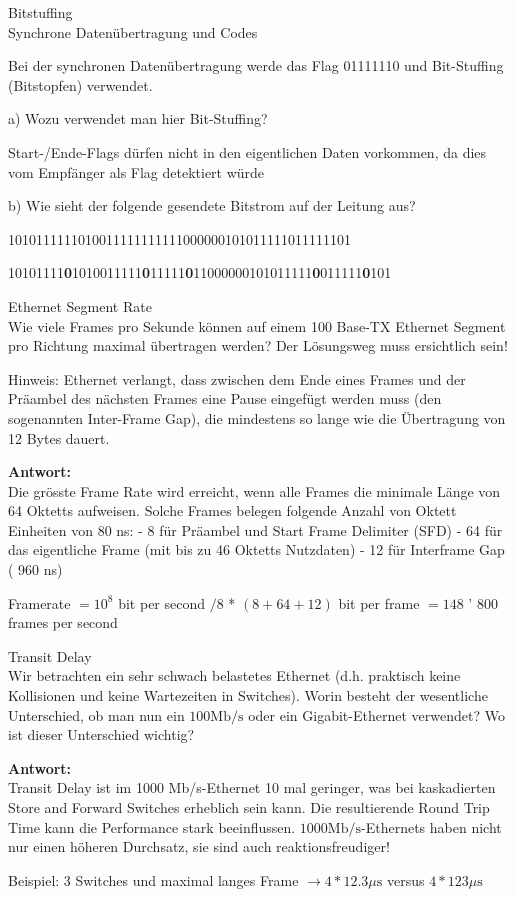 \begin{example}{Bitstuffing}\\
Synchrone Datenübertragung und Codes

Bei der synchronen Datenübertragung werde das Flag 01111110 und Bit-Stuffing (Bitstopfen) verwendet.

a) Wozu verwendet man hier Bit-Stuffing?

Start-/Ende-Flags dürfen nicht in den eigentlichen Daten vorkommen, da dies vom Empfänger als Flag detektiert würde

b) Wie sieht der folgende gesendete Bitstrom auf der Leitung aus?

1010111111010011111111111000000101011111011111101

10101111\textbf{0}1010011111\textbf{0}11111\textbf{0}11000000101011111\textbf{0}011111\textbf{0}101
\end{example}
\begin{example}{Ethernet Segment Rate}\\
Wie viele Frames pro Sekunde können auf einem 100 Base-TX Ethernet Segment pro Richtung maximal übertragen werden? Der Lösungsweg muss ersichtlich sein!

Hinweis: Ethernet verlangt, dass zwischen dem Ende eines Frames und der Präambel des nächsten Frames eine Pause eingefügt werden muss (den sogenannten Inter-Frame Gap), die mindestens so lange wie die Übertragung von 12 Bytes dauert.

\textbf{Antwort:}\\
Die grösste Frame Rate wird erreicht, wenn alle Frames die minimale Länge von 64 Oktetts aufweisen. Solche Frames belegen folgende Anzahl von Oktett Einheiten von 80 ns:
- 8 für Präambel und Start Frame Delimiter (SFD)
- 64 für das eigentliche Frame (mit bis zu 46 Oktetts Nutzdaten)
- 12 für Interframe Gap ( 960 ns)

Framerate $=10^{8}$ bit per second $/ 8$ * $(8+64+12)$ bit per frame $=148$ ' 800 frames per second
\end{example}
\begin{example}{Transit Delay}\\
Wir betrachten ein sehr schwach belastetes Ethernet (d.h. praktisch keine Kollisionen und keine Wartezeiten in Switches). Worin besteht der wesentliche Unterschied, ob man nun ein $100 \mathrm{Mb} / \mathrm{s}$ oder ein Gigabit-Ethernet verwendet? Wo ist dieser Unterschied wichtig?

\textbf{Antwort:}\\
Transit Delay ist im 1000 Mb/s-Ethernet 10 mal geringer, was bei kaskadierten Store and Forward Switches erheblich sein kann. Die resultierende Round Trip Time kann die Performance stark beeinflussen. $1000 \mathrm{Mb} / \mathrm{s}$-Ethernets haben nicht nur einen höheren Durchsatz, sie sind auch reaktionsfreudiger!

Beispiel: 3 Switches und maximal langes Frame $\rightarrow 4 * 12.3 \mu \mathrm{s}$ versus $4 * 123 \mu \mathrm{s}$
\end{example}
